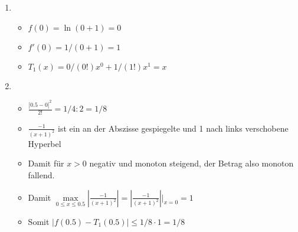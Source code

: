\item
	\begin{enumerate}
	
	\item
		\begin{itemize}
			\item $f(0) = \ln(0+1) = 0$
			\item $f'(0) = 1/(0+1) = 1$
			\item $T_1(x) = 0/(0!)x^0+1/(1!)x^1 = x$
		\end{itemize}
	
	\item
		\begin{itemize}
			\item $\frac{|0.5-0|^2}{2!} = 1/4 : 2 = 1/8$
			\item $\frac{-1}{(x+1)^2}$ ist ein an der Abszisse gespiegelte und 1 nach links verschobene Hyperbel
			\item Damit für $x>0$ negativ und monoton steigend, der Betrag also monoton fallend.
			\item Damit $\max\limits_{0\le x \le 0.5} |\frac{-1}{(x+1)^2}| = |\frac{-1}{(x+1)^2}| \bigg\rvert_{x=0} = 1 $
			\item Somit $|f(0.5) - T_1(0.5)| \le 1/8 \cdot 1 = 1 / 8$
		\end{itemize}
		
	\end{enumerate}
